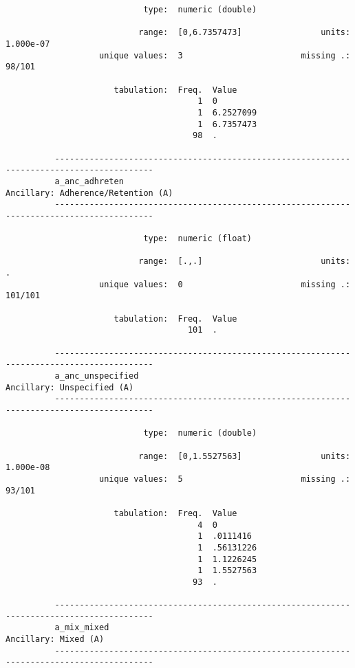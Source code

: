 \documentclass{article}
\begin{document}
\begin{verbatim}
                            type:  numeric (double)
          
                           range:  [0,6.7357473]                units:  1.000e-07
                   unique values:  3                        missing .:  98/101
          
                      tabulation:  Freq.  Value
                                       1  0
                                       1  6.2527099
                                       1  6.7357473
                                      98  .
          
          ------------------------------------------------------------------------------------------
          a_anc_adhreten                                          Ancillary: Adherence/Retention (A)
          ------------------------------------------------------------------------------------------
          
                            type:  numeric (float)
          
                           range:  [.,.]                        units:  .
                   unique values:  0                        missing .:  101/101
          
                      tabulation:  Freq.  Value
                                     101  .
          
          ------------------------------------------------------------------------------------------
          a_anc_unspecified                                               Ancillary: Unspecified (A)
          ------------------------------------------------------------------------------------------
          
                            type:  numeric (double)
          
                           range:  [0,1.5527563]                units:  1.000e-08
                   unique values:  5                        missing .:  93/101
          
                      tabulation:  Freq.  Value
                                       4  0
                                       1  .0111416
                                       1  .56131226
                                       1  1.1226245
                                       1  1.5527563
                                      93  .
          
          ------------------------------------------------------------------------------------------
          a_mix_mixed                                                           Ancillary: Mixed (A)
          ------------------------------------------------------------------------------------------
          

\end{verbatim}
\end{document}
